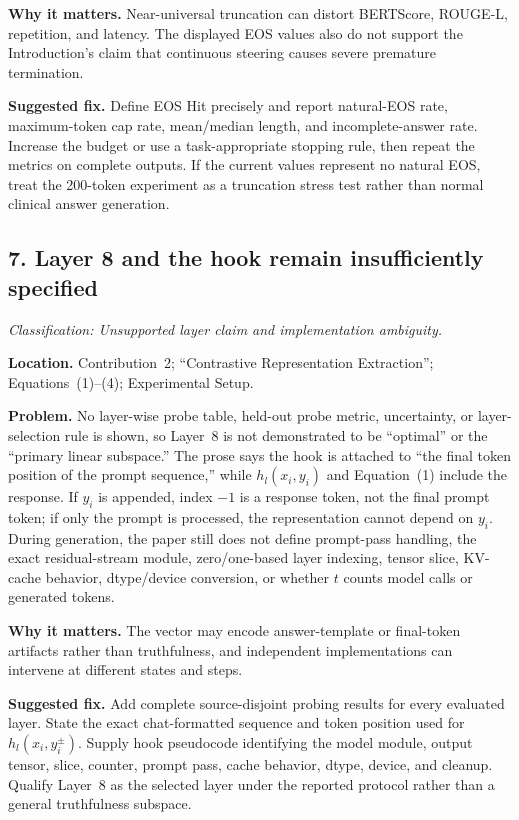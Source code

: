 \documentclass[11pt]{article}
\newcommand{\findinglabel}[1]{\textbf{#1}}
\newcommand{\classification}[1]{\textit{Classification: #1.}}
\begin{document}
\findinglabel{Why it matters.} Near-universal truncation can distort BERTScore, ROUGE-L, repetition, and latency.  The displayed EOS values also do not support the Introduction's claim that continuous steering causes severe premature termination.

\findinglabel{Suggested fix.} Define EOS Hit precisely and report natural-EOS rate, maximum-token cap rate, mean/median length, and incomplete-answer rate.  Increase the budget or use a task-appropriate stopping rule, then repeat the metrics on complete outputs.  If the current values represent no natural EOS, treat the 200-token experiment as a truncation stress test rather than normal clinical answer generation.

\subsection*{7. Layer 8 and the hook remain insufficiently specified}

\classification{Unsupported layer claim and implementation ambiguity}

\findinglabel{Location.} Contribution~2; ``Contrastive Representation Extraction''; Equations~(1)--(4); Experimental Setup.

\findinglabel{Problem.} No layer-wise probe table, held-out probe metric, uncertainty, or layer-selection rule is shown, so Layer~8 is not demonstrated to be ``optimal'' or the ``primary linear subspace.''  The prose says the hook is attached to ``the final token position of the prompt sequence,'' while $h_l(x_i,y_i)$ and Equation~(1) include the response.  If $y_i$ is appended, index $-1$ is a response token, not the final prompt token; if only the prompt is processed, the representation cannot depend on $y_i$.  During generation, the paper still does not define prompt-pass handling, the exact residual-stream module, zero/one-based layer indexing, tensor slice, KV-cache behavior, dtype/device conversion, or whether $t$ counts model calls or generated tokens.

\findinglabel{Why it matters.} The vector may encode answer-template or final-token artifacts rather than truthfulness, and independent implementations can intervene at different states and steps.

\findinglabel{Suggested fix.} Add complete source-disjoint probing results for every evaluated layer.  State the exact chat-formatted sequence and token position used for $h_l(x_i,y_i^{\pm})$.  Supply hook pseudocode identifying the model module, output tensor, slice, counter, prompt pass, cache behavior, dtype, device, and cleanup.  Qualify Layer~8 as the selected layer under the reported protocol rather than a general truthfulness subspace.
\end{document}
